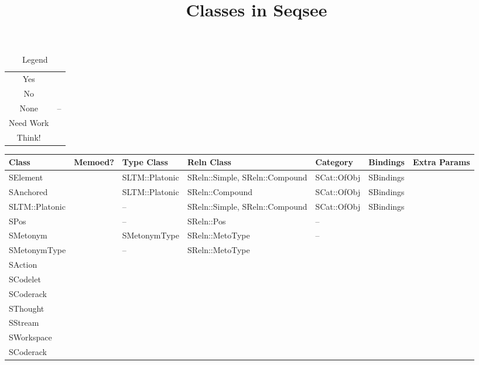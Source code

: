 \documentclass{article}
\begin{document}
\title{Classes in Seqsee}
\maketitle

\newcommand{\no}{\XSolid}
\newcommand{\yes}{\Checkmark}
\newcommand{\none}{--}
\newcommand{\needwork}{\PencilRightDown}
\newcommand{\think}{\TwelweStar}
\small

\begin{table}[htbp]
  \centering
  \begin{tabular}[h]{cc}
    \hline Yes & \yes\\
    No & \no\\
    None & \none\\
    Need Work & \needwork\\
    Think! & \think\\\hline
  \end{tabular}
  \caption{Legend}
  
\end{table}

\hspace{-2in}\begin{tabular}{|p{0.8in}|p{0.6in}|p{0.8in}|p{1in}|p{0.8in}|p{0.8in}|p{2in}|}
\textbf{Class}&\textbf{Memoed?}&\textbf{Type Class}&\textbf{Reln Class}&\textbf{Category}&\textbf{Bindings}&\textbf{Extra Params}\\\hline
SElement & \no & SLTM::Platonic & SReln::Simple, SReln::Compound & SCat::OfObj & SBindings & \\\hline

SAnchored & \no & SLTM::Platonic & SReln::Compound & SCat::OfObj & SBindings & \\\hline

SLTM::Platonic & \yes & \none & SReln::Simple, SReln::Compound & SCat::OfObj & SBindings & \\\hline
SPos & \yes & \none & SReln::Pos & \none & & \\\hline
SMetonym & \no & SMetonymType & SReln::MetoType & \none & & \\\hline
SMetonymType & \yes & \none & SReln::MetoType & && \\\hline
SAction & \\
SCodelet & \\
SCoderack &\\
SThought & \\\hline

SStream & \\
SWorkspace &\\
SCoderack & \\\hline

\end{tabular}
\end{document}
